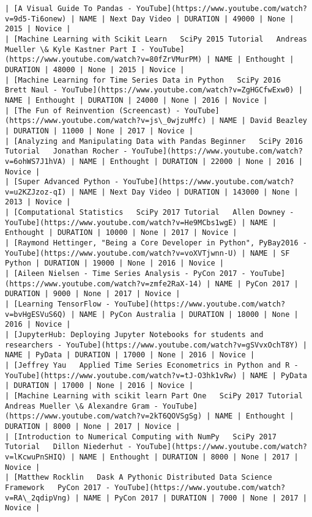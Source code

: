 \documentclass[11pt]{article}
\begin{document}
\begin{Verbatim}[commandchars=\\\{\}]
| [A Visual Guide To Pandas - YouTube](https://www.youtube.com/watch?v=9d5-Ti6onew) | NAME | Next Day Video | DURATION | 49000 | None | 2015 | Novice |
| [Machine Learning with Scikit Learn   SciPy 2015 Tutorial   Andreas Mueller \& Kyle Kastner Part I - YouTube](https://www.youtube.com/watch?v=80fZrVMurPM) | NAME | Enthought | DURATION | 48000 | None | 2015 | Novice |
| [Machine Learning for Time Series Data in Python   SciPy 2016   Brett Naul - YouTube](https://www.youtube.com/watch?v=ZgHGCfwExw0) | NAME | Enthought | DURATION | 24000 | None | 2016 | Novice |
| [The Fun of Reinvention (Screencast) - YouTube](https://www.youtube.com/watch?v=js\_0wjzuMfc) | NAME | David Beazley | DURATION | 11000 | None | 2017 | Novice |
| [Analyzing and Manipulating Data with Pandas Beginner   SciPy 2016 Tutorial   Jonathan Rocher - YouTube](https://www.youtube.com/watch?v=6ohWS7J1hVA) | NAME | Enthought | DURATION | 22000 | None | 2016 | Novice |
| [Super Advanced Python - YouTube](https://www.youtube.com/watch?v=u2KZJzoz-qI) | NAME | Next Day Video | DURATION | 143000 | None | 2013 | Novice |
| [Computational Statistics   SciPy 2017 Tutorial   Allen Downey - YouTube](https://www.youtube.com/watch?v=He9MCbs1wgE) | NAME | Enthought | DURATION | 10000 | None | 2017 | Novice |
| [Raymond Hettinger, "Being a Core Developer in Python", PyBay2016 - YouTube](https://www.youtube.com/watch?v=voXVTjwnn-U) | NAME | SF Python | DURATION | 19000 | None | 2016 | Novice |
| [Aileen Nielsen - Time Series Analysis - PyCon 2017 - YouTube](https://www.youtube.com/watch?v=zmfe2RaX-14) | NAME | PyCon 2017 | DURATION | 9000 | None | 2017 | Novice |
| [Learning TensorFlow - YouTube](https://www.youtube.com/watch?v=bvHgESVuS6Q) | NAME | PyCon Australia | DURATION | 18000 | None | 2016 | Novice |
| [JupyterHub: Deploying Jupyter Notebooks for students and researchers - YouTube](https://www.youtube.com/watch?v=gSVvxOchT8Y) | NAME | PyData | DURATION | 17000 | None | 2016 | Novice |
| [Jeffrey Yau   Applied Time Series Econometrics in Python and R - YouTube](https://www.youtube.com/watch?v=tJ-O3hk1vRw) | NAME | PyData | DURATION | 17000 | None | 2016 | Novice |
| [Machine Learning with scikit learn Part One   SciPy 2017 Tutorial   Andreas Mueller \& Alexandre Gram - YouTube](https://www.youtube.com/watch?v=2kT6QOVSgSg) | NAME | Enthought | DURATION | 8000 | None | 2017 | Novice |
| [Introduction to Numerical Computing with NumPy   SciPy 2017 Tutorial   Dillon Niederhut - YouTube](https://www.youtube.com/watch?v=lKcwuPnSHIQ) | NAME | Enthought | DURATION | 8000 | None | 2017 | Novice |
| [Matthew Rocklin   Dask A Pythonic Distributed Data Science Framework   PyCon 2017 - YouTube](https://www.youtube.com/watch?v=RA\_2qdipVng) | NAME | PyCon 2017 | DURATION | 7000 | None | 2017 | Novice |

\end{Verbatim}
\end{document}

